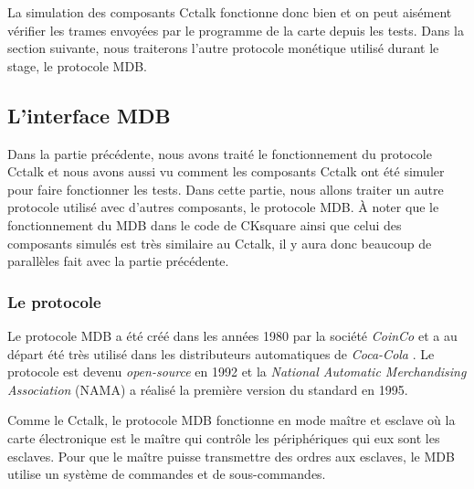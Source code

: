 \documentclass[a4paper]{article}
\begin{document}
La simulation des composants Cctalk fonctionne donc bien et on peut aisément
vérifier les trames envoyées par le programme de la carte depuis les tests. Dans
la section suivante, nous traiterons l'autre protocole monétique utilisé durant
le stage, le protocole MDB.
\subsection{L'interface MDB}%

Dans la partie précédente, nous avons traité le fonctionnement du protocole
Cctalk et nous avons aussi vu comment les composants Cctalk ont été simuler pour
faire fonctionner les tests. Dans cette partie, nous allons traiter un autre
protocole utilisé avec d'autres composants, le protocole MDB. À noter que le
fonctionnement du MDB dans le code de CKsquare ainsi que celui des composants
simulés est très similaire au Cctalk, il y aura donc beaucoup de parallèles fait
avec la partie précédente.

\subsubsection{Le protocole}

Le protocole MDB a été créé dans les années 1980 par la société \textit{CoinCo}
et a au départ été très utilisé dans les distributeurs automatiques de
\textit{Coca-Cola} \cite{enwiki:1094073752}. Le protocole est devenu
\textit{open-source} en 1992 et la \textit{National Automatic Merchandising
Association} (NAMA) a réalisé la première version du standard en 1995.

Comme le Cctalk, le protocole MDB fonctionne en mode maître et esclave où la
carte électronique est le maître qui contrôle les périphériques qui eux sont les
esclaves. Pour que le maître puisse transmettre des ordres aux esclaves, le MDB
utilise un système de commandes et de sous-commandes.
\end{document}
